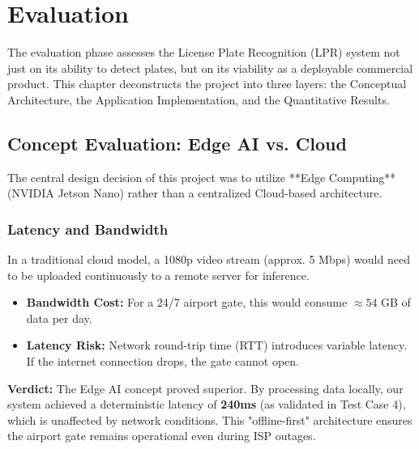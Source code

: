 %
%

\chapter{Evaluation} \label{ch:evaluation}

The evaluation phase assesses the License Plate Recognition (LPR) system not just on its ability to detect plates, but on its viability as a deployable commercial product. This chapter deconstructs the project into three layers: the Conceptual Architecture, the Application Implementation, and the Quantitative Results.

\section{Concept Evaluation: Edge AI vs. Cloud}
The central design decision of this project was to utilize **Edge Computing** (NVIDIA Jetson Nano) rather than a centralized Cloud-based architecture.

\subsection{Latency and Bandwidth}
In a traditional cloud model, a 1080p video stream (approx. 5 Mbps) would need to be uploaded continuously to a remote server for inference.
\begin{itemize}
	\item \textbf{Bandwidth Cost:} For a 24/7 airport gate, this would consume $\approx 54$ GB of data per day.
	\item \textbf{Latency Risk:} Network round-trip time (RTT) introduces variable latency. If the internet connection drops, the gate cannot open.
\end{itemize}
\textbf{Verdict:} The Edge AI concept proved superior. By processing data locally, our system achieved a deterministic latency of \textbf{240ms} (as validated in Test Case 4), which is unaffected by network conditions. This "offline-first" architecture ensures the airport gate remains operational even during ISP outages.


